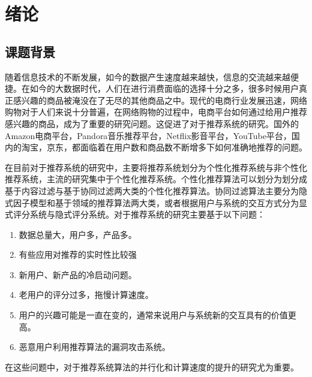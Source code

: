 \chapter{绪论}
%
%
%
%
%



\section{课题背景}
随着信息技术的不断发展，如今的数据产生速度越来越快，信息的交流越来越便捷。在如今的大数据时代，人们在进行消费面临的选择十分之多，很多时候用户真正感兴趣的商品被淹没在了无尽的其他商品之中。现代的电商行业发展迅速，网络购物对于人们来说十分普遍，在网络购物的过程中，电商平台如何通过给用户推荐感兴趣的商品，成为了重要的研究问题。这促进了对于推荐系统的研究。国外的Amazon电商平台\cite{Linden:2003kc}，Pandora音乐推荐平台，Netflix影音平台，YouTube平台\cite{Davidson:2010hg}，国内的淘宝，京东，都面临着在用户数和商品数不断增多下如何准确地推荐的问题。

在目前对于推荐系统的研究中，主要将推荐系统划分为个性化推荐系统与非个性化推荐系统，主流的研究集中于个性化推荐系统。个性化推荐算法可以划分为划分成基于内容过滤与基于协同过滤两大类的个性化推荐算法。协同过滤算法主要分为隐式因子模型和基于领域的推荐算法两大类，或者根据用户与系统的交互方式分为显式评分系统与隐式评分系统。对于推荐系统的研究主要基于以下问题：
\begin{enumerate}
    \item  数据总量大，用户多，产品多。
    \item 有些应用对推荐的实时性比较强
    \item 新用户、新产品的冷启动问题。
    \item 老用户的评分过多，拖慢计算速度。
    \item  用户的兴趣可能是一直在变的，通常来说用户与系统新的交互具有的价值更高。
    \item 恶意用户利用推荐算法的漏洞攻击系统。
 \end{enumerate}
 在这些问题中，对于推荐系统算法的并行化和计算速度的提升的研究尤为重要。
 
